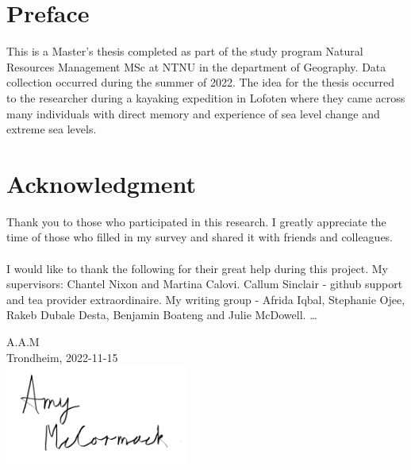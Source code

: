 \section{Preface}
This is a Master's thesis completed as part of the study program Natural Resources Management MSc at NTNU in the department of Geography. Data collection occurred during the summer of 2022. The idea for the thesis occurred to the researcher during a kayaking expedition in Lofoten where they came across many individuals with direct memory and experience of sea level change and extreme sea levels. \\[2cm]

\section{Acknowledgment}
Thank you to those who participated in this research. I greatly appreciate the time of those who filled in my survey and shared it with friends and colleagues.
\paragraph{}

I would like to thank the following for their great help during this project. My supervisors: Chantel Nixon and Martina Calovi. Callum Sinclair - github support and tea provider extraordinaire. My writing group - Afrida Iqbal, Stephanie Ojee, Rakeb Dubale Desta, Benjamin Boateng and Julie McDowell.  \ldots



\begin{flushright}
A.A.M\\[1pc]
Trondheim, 2022-11-15\\[1pc]
\includegraphics[width=6cm]{fig/to use signature png.png}
\end{flushright}
